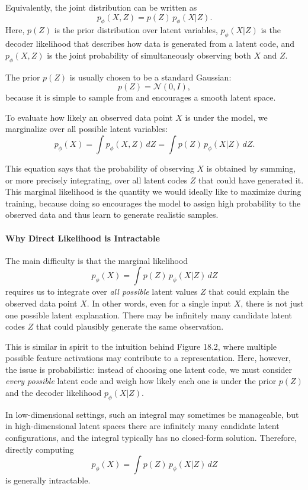 \documentclass{article}
\begin{document}
Equivalently, the joint distribution can be written as
\[
p_\phi(X,Z)=p(Z)\,p_\phi(X|Z).
\]
Here, \(p(Z)\) is the prior distribution over latent variables, \(p_\phi(X|Z)\) is the decoder likelihood that describes how data is generated from a latent code, and \(p_\phi(X,Z)\) is the joint probability of simultaneously observing both \(X\) and \(Z\).

The prior \(p(Z)\) is usually chosen to be a standard Gaussian:
\[
p(Z)=\mathcal{N}(0,I),
\]
because it is simple to sample from and encourages a smooth latent space.

To evaluate how likely an observed data point \(X\) is under the model, we marginalize over all possible latent variables:
\[
p_\phi(X)=\int p_\phi(X,Z)\,dZ
=
\int p(Z)\,p_\phi(X|Z)\,dZ.
\]

This equation says that the probability of observing \(X\) is obtained by summing, or more precisely integrating, over all latent codes \(Z\) that could have generated it. This marginal likelihood is the quantity we would ideally like to maximize during training, because doing so encourages the model to assign high probability to the observed data and thus learn to generate realistic samples.

\paragraph{Why Direct Likelihood is Intractable}

The main difficulty is that the marginal likelihood
\[
p_\phi(X)=\int p(Z)\,p_\phi(X|Z)\,dZ
\]
requires us to integrate over \emph{all possible} latent values \(Z\) that could explain the observed data point \(X\). In other words, even for a single input \(X\), there is not just one possible latent explanation. There may be infinitely many candidate latent codes \(Z\) that could plausibly generate the same observation.

This is similar in spirit to the intuition behind Figure 18.2, where multiple possible feature activations may contribute to a representation. Here, however, the issue is probabilistic: instead of choosing one latent code, we must consider \emph{every possible} latent code and weigh how likely each one is under the prior \(p(Z)\) and the decoder likelihood \(p_\phi(X|Z)\).

In low-dimensional settings, such an integral may sometimes be manageable, but in high-dimensional latent spaces there are infinitely many candidate latent configurations, and the integral typically has no closed-form solution. Therefore, directly computing
\[
p_\phi(X)=\int p(Z)\,p_\phi(X|Z)\,dZ
\]
is generally intractable.
\end{document}
